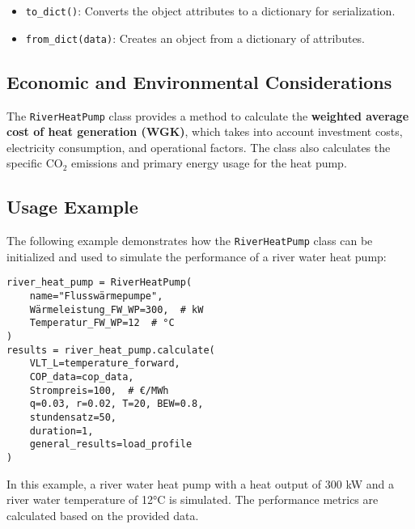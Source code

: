 \begin{itemize}
    \item \texttt{to\_dict()}: Converts the object attributes to a dictionary for serialization.

    \item \texttt{from\_dict(data)}: Creates an object from a dictionary of attributes.
\end{itemize}

\subsection{Economic and Environmental Considerations}
The \texttt{RiverHeatPump} class provides a method to calculate the \textbf{weighted average cost of heat generation (WGK)}, which takes into account investment costs, electricity consumption, and operational factors. The class also calculates the specific CO$_2$ emissions and primary energy usage for the heat pump.

\subsection{Usage Example}
The following example demonstrates how the \texttt{RiverHeatPump} class can be initialized and used to simulate the performance of a river water heat pump:

\begin{verbatim}
river_heat_pump = RiverHeatPump(
    name="Flusswärmepumpe", 
    Wärmeleistung_FW_WP=300,  # kW
    Temperatur_FW_WP=12  # °C
)
results = river_heat_pump.calculate(
    VLT_L=temperature_forward, 
    COP_data=cop_data, 
    Strompreis=100,  # €/MWh
    q=0.03, r=0.02, T=20, BEW=0.8, 
    stundensatz=50, 
    duration=1, 
    general_results=load_profile
)
\end{verbatim}
In this example, a river water heat pump with a heat output of 300 kW and a river water temperature of 12°C is simulated. The performance metrics are calculated based on the provided data.